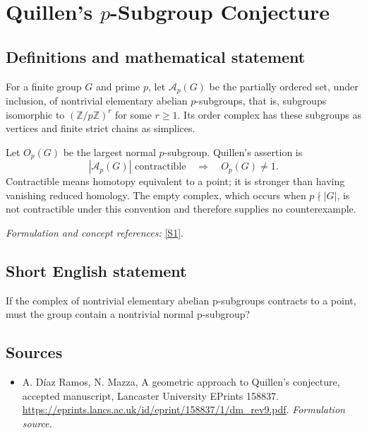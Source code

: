 \documentclass[11pt]{article}
\begin{document}
\section*{\texorpdfstring{Quillen's $p$-Subgroup Conjecture}{Quillen's \$p\$-Subgroup Conjecture}}\label{30002059}
\subsection{Definitions and mathematical statement}
For a finite group $G$ and prime $p$, let $\mathcal A_p(G)$ be the partially ordered set, under inclusion, of nontrivial elementary abelian $p$-subgroups, that is, subgroups isomorphic to $({\mathbb{Z}}/p{\mathbb{Z}})^r$ for some $r\ge1$. Its order complex has these subgroups as vertices and finite strict chains as simplices.

Let $O_p(G)$ be the largest normal $p$-subgroup. Quillen's assertion is
\[
 |\mathcal A_p(G)|\text{ contractible}
                   \quad\Longrightarrow\quad O_p(G)\ne1.
\]
Contractible means homotopy equivalent to a point; it is stronger than having vanishing reduced homology. The empty complex, which occurs when $p\nmid|G|$, is not contractible under this convention and therefore supplies no counterexample.
\par\smallskip\textit{Formulation and concept references:} \href{https://eprints.lancs.ac.uk/id/eprint/158837/1/dm_rev9.pdf}{[S1]}.

\subsection{Short English statement}
If the complex of nontrivial elementary abelian p-subgroups contracts to a point, must the group contain a nontrivial normal p-subgroup?
\subsection{Sources}
\begin{itemize}
\item[S1]A. Díaz Ramos, N. Mazza, A geometric approach to Quillen's conjecture, accepted manuscript, Lancaster University EPrints 158837.
\url{https://eprints.lancs.ac.uk/id/eprint/158837/1/dm_rev9.pdf}.
\textit{Formulation source.}
\end{itemize}
\end{document}
